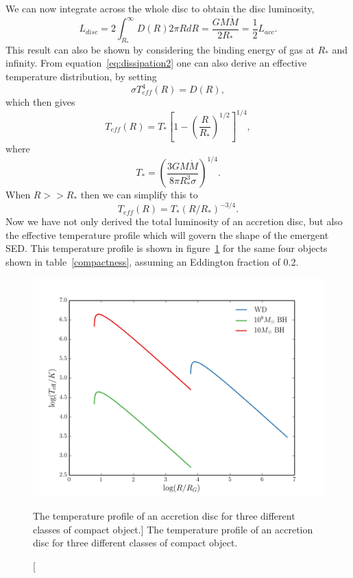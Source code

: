 We can now integrate across the whole disc to obtain the disc luminosity,
\begin{equation}
L_{disc} = 2 \int^\infty_{R_*} D(R) 2\pi R dR = \frac{G M \dot{M}}{2 R_*} = \frac{1}{2} L_{acc}.
\label{eq:ldisc}
\end{equation}
This result can also be shown by considering the binding energy of gas at $R_*$ and infinity.
From equation~\ref{eq:dissipation2} one can also derive an effective temperature distribution,
by setting
\begin{equation}
\sigma T_{eff}^4 (R) = D(R),
\end{equation}
which then gives
\begin{equation}
T_{eff} (R) = T_* \left[1 - \left( \frac{R}{R_*} \right)^{1/2} \right]^{1/4},
\end{equation}
where
\begin{equation}
T_* = \left ( \frac{3 G M \dot{M}}{8 \pi R_*^3 \sigma} \right)^{1/4}.
\end{equation}
When $R>>R_*$ then we can simplify this to
\begin{equation}
T_{eff} (R) = T_* (R / R_*)^{-3/4}.
\end{equation}
Now we have not only derived the total luminosity of an accretion disc, but
also the effective temperature profile which will govern the shape of the emergent SED.
This temperature profile is shown in figure~\ref{fig:disk_t}
for the same four objects shown in table~\ref{compactness}, 
assuming an Eddington fraction of 0.2.

\begin{figure}
\centering
\includegraphics[width=1.0\textwidth]{figures/01-intro/disk_t.png}
\caption
[The temperature profile of an accretion disc for three different classes
of compact object.]
{
The temperature profile of an accretion disc for three different classes
of compact object.
} 
\label{fig:disk_t}
\end{figure}

